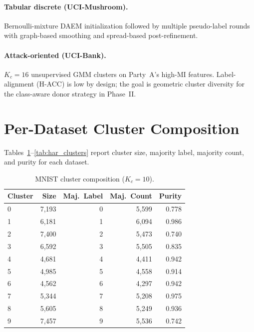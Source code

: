 \documentclass{article}
\begin{document}
\paragraph{Tabular discrete (UCI-Mushroom).}
Bernoulli-mixture DAEM initialization followed by multiple pseudo-label
rounds with graph-based smoothing and spread-based post-refinement.

\paragraph{Attack-oriented (UCI-Bank).}
$K_c\!=\!16$ unsupervised GMM clusters on Party~A's high-MI features.
Label-alignment (H-ACC) is low by design; the goal is geometric cluster
diversity for the class-aware donor strategy in Phase~II.

\section{Per-Dataset Cluster Composition}
\label{app:clusters}

Tables~\ref{tab:mnist_clusters}--\ref{tab:har_clusters} report cluster size,
majority label, majority count, and purity for each dataset.

\begin{table}[h]
\centering
\caption{MNIST cluster composition ($K_c\!=\!10$).}
\label{tab:mnist_clusters}
\small
\begin{tabular}{lrrrr}
\toprule
\textbf{Cluster} & \textbf{Size} & \textbf{Maj.~Label} & \textbf{Maj.~Count} & \textbf{Purity} \\
\midrule
0 & 7,193 & 0 & 5,599 & 0.778 \\
1 & 6,181 & 1 & 6,094 & 0.986 \\
2 & 7,400 & 2 & 5,473 & 0.740 \\
3 & 6,592 & 3 & 5,505 & 0.835 \\
4 & 4,681 & 4 & 4,411 & 0.942 \\
5 & 4,985 & 5 & 4,558 & 0.914 \\
6 & 4,562 & 6 & 4,297 & 0.942 \\
7 & 5,344 & 7 & 5,208 & 0.975 \\
8 & 5,605 & 8 & 5,249 & 0.936 \\
9 & 7,457 & 9 & 5,536 & 0.742 \\
\bottomrule
\end{tabular}
\end{table}
\end{document}
